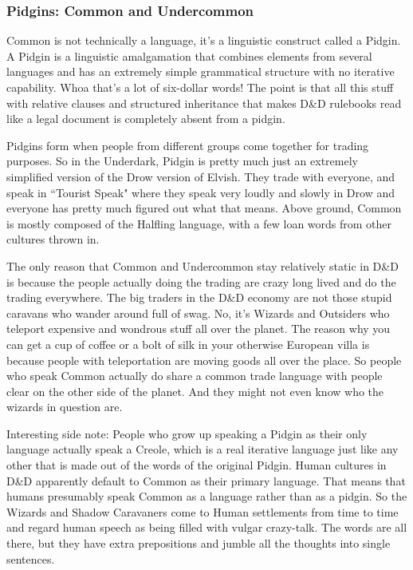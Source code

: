 \subsubsection{Pidgins: Common and Undercommon}
\vspace*{-8pt}

Common is not technically a language, it's a linguistic construct called a Pidgin. A Pidgin is a linguistic amalgamation that combines elements from several languages and has an extremely simple grammatical structure with no iterative capability. Whoa that's a lot of six-dollar words! The point is that all this stuff with relative clauses and structured inheritance that makes D\&D rulebooks read like a legal document is completely absent from a pidgin.

Pidgins form when people from different groups come together for trading purposes. So in the Underdark, Pidgin is pretty much just an extremely simplified version of the Drow version of Elvish. They trade with everyone, and speak in ``Tourist Speak" where they speak very loudly and slowly in Drow and everyone has pretty much figured out what that means. Above ground, Common is mostly composed of the Halfling language, with a few loan words from other cultures thrown in.

The only reason that Common and Undercommon stay relatively static in D\&D is because the people actually doing the trading are crazy long lived and do the trading everywhere. The big traders in the D\&D economy are not those stupid caravans who wander around full of swag. No, it's Wizards and Outsiders who teleport expensive and wondrous stuff all over the planet. The reason why you can get a cup of coffee or a bolt of silk in your otherwise European villa is because people with teleportation are moving goods all over the place. So people who speak Common actually do share a common trade language with people clear on the other side of the planet. And they might not even know who the wizards in question are.

Interesting side note: People who grow up speaking a Pidgin as their only language actually speak a Creole, which is a real iterative language just like any other that is made out of the words of the original Pidgin. Human cultures in D\&D apparently default to Common as their primary language. That means that humans presumably speak Common as a language rather than as a pidgin. So the Wizards and Shadow Caravaners come to Human settlements from time to time and regard human speech as being filled with vulgar crazy-talk. The words are all there, but they have extra prepositions and jumble all the thoughts into single sentences.

